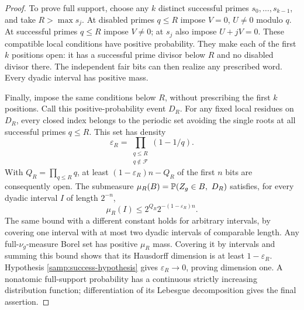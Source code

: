 \begin{proof}
To prove full support, choose any $k$ distinct successful primes
$s_0,\ldots,s_{k-1}$, and take $R>\max s_j$.  At disabled primes
$q\le R$ impose $V=0$, $U\ne0$ modulo $q$.  At successful primes
$q\le R$ impose $V\ne0$; at $s_j$ also impose $U+jV=0$.
These compatible local conditions have positive probability.
They make each of the first $k$ positions open: it has a successful
prime divisor below $R$ and no disabled divisor there.
The independent fair bits can then realize any prescribed word.
Every dyadic interval has positive mass.

Finally, impose the same conditions below $R$, without prescribing
the first $k$ positions.  Call this positive-probability event $D_R$.
For any fixed local residues on $D_R$, every closed index belongs to
the periodic set avoiding the single roots at all successful
primes $q\le R$.  This set has density
\[
 \varepsilon_R=\prod_{\substack{q\le R\\q\notin\mathcal F}}(1-1/q).
\]
With $Q_R=\prod_{q\le R}q$, at least
$(1-\varepsilon_R)n-Q_R$ of the first $n$ bits are consequently
open.  The submeasure
$\mu_R(B)=\mathbb P(Z_g\in B,\ D_R)$ satisfies, for every dyadic
interval $I$ of length $2^{-n}$,
\[
 \mu_R(I)\le 2^{Q_R}2^{-(1-\varepsilon_R)n}.
\]
The same bound with a different constant holds for arbitrary
intervals, by covering one interval with at most two dyadic
intervals of comparable length.  Any full-$\nu_g$-measure Borel
set has positive $\mu_R$ mass.  Covering it by intervals and summing
this bound shows that its Hausdorff dimension is at least
$1-\varepsilon_R$.  Hypothesis \eqref{samp:success-hypothesis}
gives $\varepsilon_R\to0$, proving dimension one.  A nonatomic
full-support probability has a continuous strictly increasing
distribution function; differentiation of its Lebesgue
decomposition gives the final assertion.
\end{proof}

